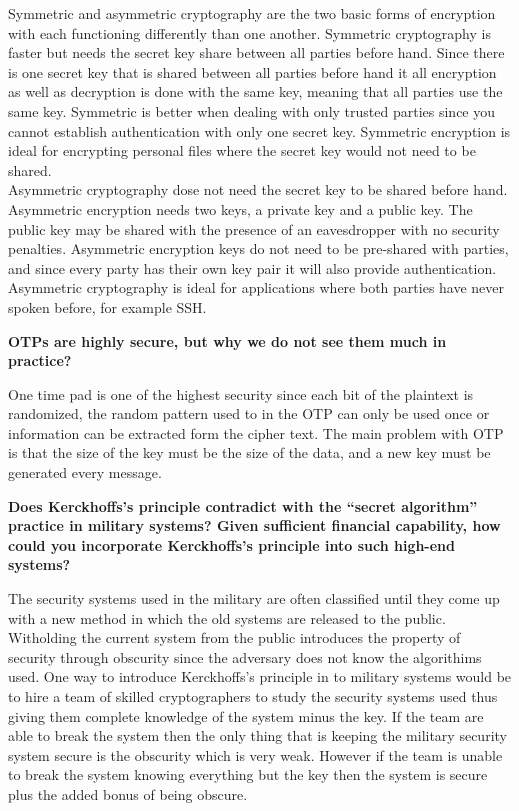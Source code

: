 \documentclass[letterpaper,11pt,notitlepage,fleqn]{article}
\begin{document}
Symmetric and asymmetric cryptography are the two basic forms of encryption with each functioning differently than one another. Symmetric cryptography is faster but needs the secret key share between all parties before hand. Since there is one secret key that is shared between all parties before hand it all encryption as well as decryption is done with the same key, meaning that all parties use the same key. Symmetric is better when dealing with only trusted parties since you cannot
establish authentication with only one secret key. Symmetric encryption is ideal for encrypting personal files where the secret key would not need to be shared.\\
\indent Asymmetric cryptography dose not need the secret key to be shared before hand. Asymmetric encryption needs two keys, a private key and a public key. The public key may be shared with the presence of an eavesdropper with no security penalties. Asymmetric encryption keys do not need to be pre-shared with parties, and since every party has their own key pair it will also provide authentication. Asymmetric cryptography is ideal for applications where both parties have never spoken before, for example SSH. 

\noindent \textbf{OTPs are highly secure, but why we do not see them much in practice?}


One time pad is one of the highest security since each bit of the plaintext is randomized, the random pattern used to in the OTP can only be used once or information can be extracted form the cipher text. The main problem with OTP is that the size of the key must be the size of the data, and a new key must be generated every message. 

\noindent \textbf{Does Kerckhoffs's principle contradict with the ``secret algorithm'' practice in military systems? Given sufficient financial capability, how could you incorporate Kerckhoffs's principle into such high-end systems?}

The security systems used in the military are often classified until they come up with a new method in which the old systems are released to the public. Witholding the current system from the public introduces the property of security through obscurity since the adversary does not know the algorithims used. One way to introduce Kerckhoffs's principle in to military systems would be to hire a team of skilled cryptographers to study the security systems used thus giving them complete knowledge
of the system minus the key. If the team are able to break the system then the only thing that is keeping the military security system secure is the obscurity which is very weak. However if the team is unable to break the system knowing everything but the key then the system is secure plus the added bonus of being obscure.
\end{document}
